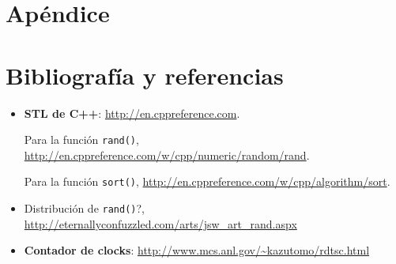 \section{Apéndice}

\section{Bibliografía y referencias} %

\begin{itemize}
	\item \textbf{STL de C++}: \url{http://en.cppreference.com}.
	\par Para la función \texttt{rand()}, \url{http://en.cppreference.com/w/cpp/numeric/random/rand}.
	\par Para la función \texttt{sort()}, \url{http://en.cppreference.com/w/cpp/algorithm/sort}.
	\item Distribución de \texttt{rand()}?, \url{http://eternallyconfuzzled.com/arts/jsw\_art\_rand.aspx}
	\item \textbf{Contador de clocks}: \url{http://www.mcs.anl.gov/\~kazutomo/rdtsc.html}
\end{itemize}



